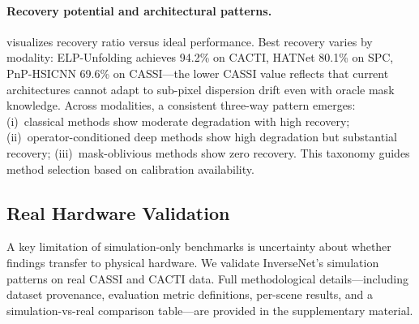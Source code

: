 \documentclass[runningheads]{llncs}
\begin{document}
\paragraph{Recovery potential and architectural patterns.}
 visualizes recovery ratio versus ideal performance.
Best recovery varies by modality: ELP-Unfolding achieves 94.2\% on CACTI, HATNet 80.1\% on SPC, PnP-HSICNN 69.6\% on CASSI---the lower CASSI value reflects that current architectures cannot adapt to sub-pixel dispersion drift even with oracle mask knowledge.
Across modalities, a consistent three-way pattern emerges: (i)~classical methods show moderate degradation with high recovery; (ii)~operator-conditioned deep methods show high degradation but substantial recovery; (iii)~mask-oblivious methods show zero recovery.
This taxonomy guides method selection based on calibration availability.

\subsection{Real Hardware Validation}
\label{sec:real_data}

A key limitation of simulation-only benchmarks is uncertainty about whether findings transfer to physical hardware.
We validate InverseNet's simulation patterns on real CASSI and CACTI data.
Full methodological details---including dataset provenance, evaluation metric definitions, per-scene results, and a simulation-vs-real comparison table---are provided in the supplementary material.
\end{document}
